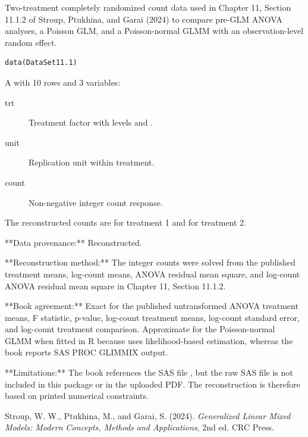 \documentclass[a4paper]{book}
\begin{document}
%
\begin{Description}
Two-treatment completely randomized count data used in Chapter 11,
Section 11.1.2 of Stroup, Ptukhina, and Garai (2024) to compare
pre-GLM ANOVA analyses, a Poisson GLM, and a Poisson-normal GLMM with
an observation-level random effect.
\end{Description}
%
\begin{Usage}
\begin{verbatim}
data(DataSet11.1)
\end{verbatim}
\end{Usage}
%
\begin{Format}
A  with 10 rows and 3 variables:
\begin{description}

\item[trt] Treatment factor with levels  and .
\item[unit] Replication unit within treatment.
\item[count] Non-negative integer count response.

\end{description}

\end{Format}
%
\begin{Details}
The reconstructed counts are  for treatment 1 and
 for treatment 2.

**Data provenance:** Reconstructed.

**Reconstruction method:** The integer counts were solved from the
published treatment means, log-count means, ANOVA residual mean square,
and log-count ANOVA residual mean square in Chapter 11, Section 11.1.2.

**Book agreement:** Exact for the published untransformed ANOVA treatment
means, F statistic, p-value, log-count treatment means, log-count standard
error, and log-count treatment comparison. Approximate for the Poisson-normal
GLMM when fitted in R because  uses likelihood-based estimation,
whereas the book reports SAS PROC GLIMMIX output.

**Limitations:** The book references the SAS file ,
but the raw SAS file is not included in this package or in the uploaded PDF.
The reconstruction is therefore based on printed numerical constraints.
\end{Details}
%
\begin{References}
Stroup, W. W., Ptukhina, M., and Garai, S. (2024).
\emph{Generalized Linear Mixed Models: Modern Concepts, Methods and
Applications}, 2nd ed. CRC Press.
\end{References}
\end{document}
